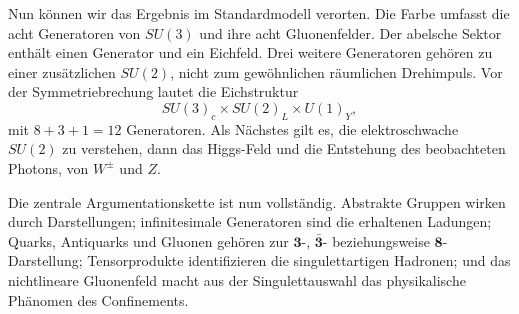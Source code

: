 Nun können wir das Ergebnis im Standardmodell verorten. Die Farbe umfasst die acht Generatoren von \(SU(3)\) und ihre acht Gluonenfelder. Der abelsche Sektor enthält einen Generator und ein Eichfeld. Drei weitere Generatoren gehören zu einer zusätzlichen \(SU(2)\), nicht zum gewöhnlichen räumlichen Drehimpuls. Vor der Symmetriebrechung lautet die Eichstruktur
\begin{equation}
SU(3)_c\times SU(2)_L\times U(1)_Y,
\end{equation}
mit \(8+3+1=12\) Generatoren. Als Nächstes gilt es, die elektroschwache \(SU(2)\) zu verstehen, dann das Higgs-Feld und die Entstehung des beobachteten Photons, von \(W^\pm\) und \(Z\).

Die zentrale Argumentationskette ist nun vollständig. Abstrakte Gruppen wirken durch Darstellungen; infinitesimale Generatoren sind die erhaltenen Ladungen; Quarks, Antiquarks und Gluonen gehören zur \(\boldsymbol 3\)-, \(\bar{\boldsymbol 3}\)- beziehungsweise \(\boldsymbol 8\)-Darstellung; Tensorprodukte identifizieren die singulettartigen Hadronen; und das nichtlineare Gluonenfeld macht aus der Singulettauswahl das physikalische Phänomen des Confinements.
